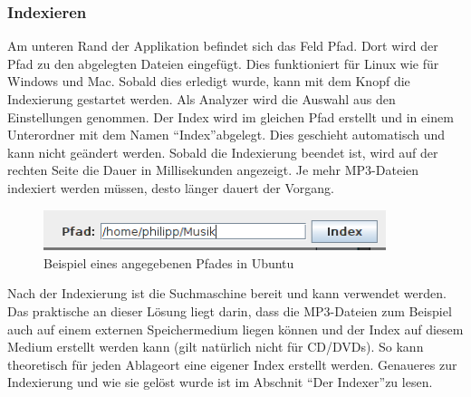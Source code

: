 \documentclass[12pt,a4paper,ngerman]{report}
\begin{document}
\subsubsection*{Indexieren}
Am unteren Rand der Applikation befindet sich das Feld Pfad. Dort wird der Pfad zu den abgelegten Dateien eingefügt. Dies funktioniert für Linux wie für Windows und Mac. Sobald dies erledigt wurde, kann mit dem Knopf die Indexierung gestartet werden. Als Analyzer wird die Auswahl aus den Einstellungen genommen. Der Index wird im gleichen Pfad erstellt und in einem Unterordner mit dem Namen \textquotedblleft Index\textquotedblright abgelegt. Dies geschieht automatisch und kann nicht geändert werden. Sobald die Indexierung beendet ist, wird auf der rechten Seite die Dauer in Millisekunden angezeigt. Je mehr MP3-Dateien indexiert werden müssen, desto länger dauert der Vorgang.
\begin{figure}[h!]
\centering
\includegraphics[width=10cm]{img/Pfadangabe.png}
\caption{Beispiel eines angegebenen Pfades in Ubuntu\protect\footnotemark}
\end{figure}
Nach der Indexierung ist die Suchmaschine bereit und kann verwendet werden. Das praktische an dieser Lösung liegt darin, dass die MP3-Dateien zum Beispiel auch auf einem externen Speichermedium liegen können und der Index auf diesem Medium erstellt werden kann (gilt natürlich nicht für CD/DVDs). So kann theoretisch für jeden Ablageort eine eigener Index erstellt werden. Genaueres zur Indexierung und wie sie gelöst wurde ist im Abschnit \textquotedblleft Der Indexer\textquotedblright zu lesen.
\end{document}

